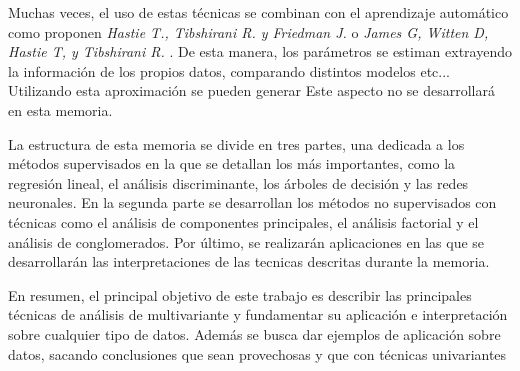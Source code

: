\noindent Muchas veces, el uso de estas técnicas se combinan con el aprendizaje automático como proponen \textit{Hastie T., Tibshirani R. y Friedman J.} \cite{Hastie 2001} o  \emph{James G, Witten D, Hastie T, y  Tibshirani R.} \cite{James 2013}. De esta manera, los parámetros se estiman extrayendo la información de los propios datos, comparando distintos modelos etc... Utilizando esta aproximación se pueden generar  Este aspecto no se desarrollará en esta memoria.  

\noindent La estructura de esta memoria se divide en tres partes, una dedicada a los métodos supervisados en la que se detallan los más importantes, como la regresión lineal, el análisis discriminante, los árboles de decisión  y las redes neuronales. En la segunda parte se desarrollan los métodos no supervisados con técnicas como el análisis de componentes principales, el análisis factorial y el análisis de conglomerados. Por último, se realizarán aplicaciones en las que se desarrollarán las interpretaciones de las tecnicas descritas durante la memoria. 

\noindent En resumen, el principal objetivo de este trabajo es describir las principales técnicas de análisis de multivariante y fundamentar su aplicación e interpretación sobre cualquier tipo de datos. Además se busca dar ejemplos de aplicación sobre datos, sacando conclusiones que sean provechosas y que con técnicas univariantes




